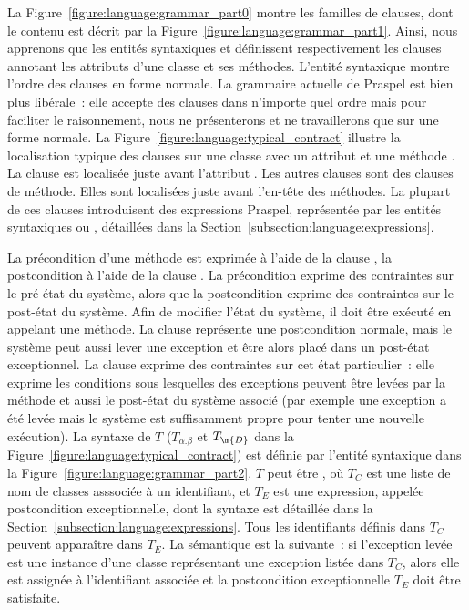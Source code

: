 La Figure~\ref{figure:language:grammar_part0} montre les familles de clauses,
dont le contenu est décrit par la Figure~\ref{figure:language:grammar_part1}.
Ainsi, nous apprenons que les entités syntaxiques  et
 définissent respectivement les clauses annotant les
attributs d'une classe et ses méthodes.  L'entité syntaxique
 montre l'ordre des clauses en forme normale. La grammaire
actuelle de Praspel est bien plus libérale~: elle accepte des clauses dans
n'importe quel ordre mais pour faciliter le raisonnement, nous ne présenterons
et ne travaillerons que sur une forme normale. La
Figure~\ref{figure:language:typical_contract} illustre la localisation typique
des clauses sur une classe  avec un attribut  et une méthode
. La clause \ainvariant est localisée juste avant l'attribut .
Les autres clauses sont des clauses de méthode.  Elles sont localisées juste
avant l'en-tête des méthodes. La plupart de ces clauses introduisent des
expressions Praspel, représentée par les entités syntaxiques 
ou , détaillées dans la
Section~\ref{subsection:language:expressions}.

La précondition d'une méthode est exprimée à l'aide de la clause \arequires, la
postcondition à l'aide de la clause \aensures. La précondition exprime des
contraintes sur le {\strong pré-état} du système, alors que la postcondition
exprime des contraintes sur le {\strong post-état} du système. Afin de modifier
l'état du système, il doit être exécuté en appelant une méthode. La clause
\aensures représente une {\strong postcondition normale}, mais le système peut
aussi lever une exception et être alors placé dans un {\strong post-état
exceptionnel}. La clause \athrowable exprime des contraintes sur cet état
particulier~: elle exprime les conditions sous lesquelles des exceptions peuvent
être levées par la méthode et aussi le post-état du système associé (par exemple
une exception a été levée mais le système est suffisamment propre pour tenter
une nouvelle exécution). La syntaxe de $T$ ($T_{\alpha.\beta}$ et $T_\m{D}$ dans
la Figure~\ref{figure:language:typical_contract}) est définie par l'entité
syntaxique  dans la
Figure~\ref{figure:language:grammar_part2}. $T$ peut être , où $T_C$ est une liste de nom de classes asssociée à un identifiant, et
$T_E$ est une expression, appelée {\strong postcondition exceptionnelle}, dont
la syntaxe est détaillée dans la Section~\ref{subsection:language:expressions}.
Tous les identifiants définis dans $T_C$ peuvent apparaître dans $T_E$. La
sémantique est la suivante~: si l'exception levée est une instance d'une classe
représentant une exception listée dans $T_C$, alors elle est assignée à
l'identifiant associée et la postcondition exceptionnelle $T_E$ doit être
satisfaite.

